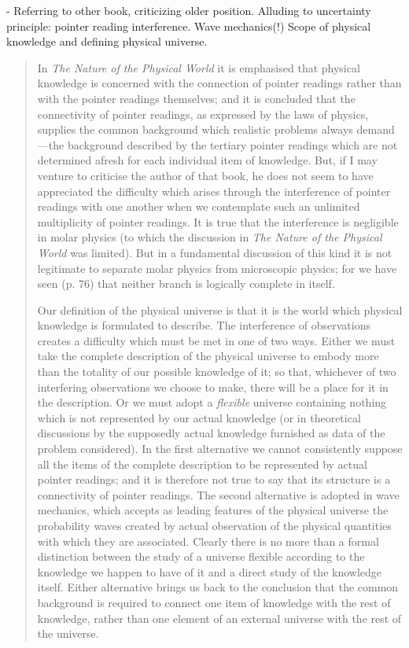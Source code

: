 - Referring to other book, criticizing older position.  Alluding to uncertainty principle: pointer reading interference.  Wave mechanics(!)  Scope of physical knowledge and defining physical universe.

\begin{quote}
    In \emph{The Nature of the Physical World} it is emphasised that physical knowledge is concerned with the connection of pointer readings rather than with the pointer readings themselves; and it is concluded that the connectivity of pointer readings, as expressed by the laws of physics, supplies the common background which realistic problems always demand---the background described by the tertiary pointer readings which are not determined afresh for each individual item of knowledge.  But, if I may venture to criticise the author of that book, he does not seem to have appreciated the difficulty which arises through the interference of pointer readings with one another when we contemplate such an unlimited multiplicity of pointer readings.  It is true that the interference is negligible in molar physics (to which the discussion in \emph{The Nature of the Physical World} was limited).  But in a fundamental discussion of this kind it is not legitimate to separate molar physics from microscopic physics; for we have seen (p. 76) that neither branch is logically complete in itself.  
    
    Our definition of the physical universe is that it is the world which physical knowledge is formulated to describe.  The interference of observations creates a difficulty which must be met in one of two ways.  Either we must take the complete description of the physical universe to embody more than the totality of our possible knowledge of it; so that, whichever of two interfering observations we choose to make, there will be a place for it in the description.  Or we must adopt a \emph{flexible} universe containing nothing which is not represented by our actual knowledge (or in theoretical discussions by the supposedly actual knowledge furnished as data of the problem considered).  In the first alternative we cannot consistently suppose all the items of the complete description to be represented by actual pointer readings; and it is therefore not true to say that its structure is a connectivity of pointer readings.  The second alternative is adopted in wave mechanics, which accepts as leading features of the physical universe the probability waves created by actual observation of the physical quantities with which they are associated.  Clearly there is no more than a formal distinction between the study of a universe flexible according to the knowledge we happen to have of it and a direct study of the knowledge itself.  Either alternative brings us back to the conclusion that the common background is required to connect one item of knowledge with the rest of knowledge, rather than one element of an external universe with the rest of the universe.
    \citep[p. 100-102]{Eddington1939}
\end{quote}

